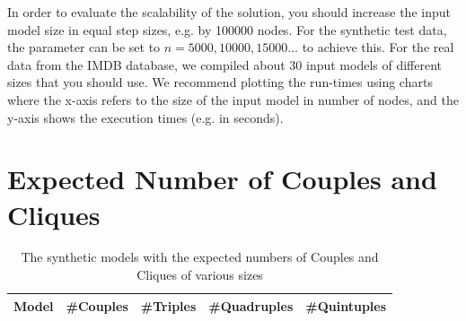 \documentclass[a4paper,11pt]{article}
\begin{document}

In order to evaluate the scalability of the solution, you should
increase the input model size in equal step sizes, e.g. by 
100000 nodes. For the synthetic test data, the parameter can be
set to $n=5000, 10000, 15000\ldots$ to achieve this. For the
real data from the IMDB database, we compiled about 30 input 
models of different sizes that you should use.
We recommend plotting the run-times using charts where
the x-axis refers to the size of the input model in number of nodes,
and the y-axis shows the execution times (e.g. in seconds).





\appendix



\section{Expected Number of Couples and Cliques}
\label{sec:expected-numbers}

\begin{table}[h!]
  \centering
  \begin{tabular}{| l | r | r | r | r |}
  \hline
  \textbf{Model} & \textbf{\#Couples} & \textbf{\#Triples} & \textbf{\#Quadruples} & \textbf{\#Quintuples}\\
  \hline
  \hline
\end{tabular}
\caption{The synthetic models with the expected numbers of Couples and Cliques of various sizes}
\label{tab:synthetic-numbers}
\end{table}
\end{document}
